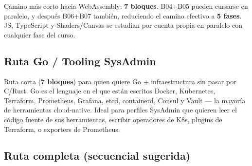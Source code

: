 \documentclass[11pt, letterpaper]{article}
\begin{document}
Camino más corto hacia WebAssembly: \textbf{7 bloques}. B04+B05 pueden
cursarse en paralelo, y después B06+B07 también, reduciendo el camino
efectivo a \textbf{5 fases}. JS, TypeScript y Shaders/Canvas se estudian
por cuenta propia en paralelo con cualquier fase del curso.

\subsection{Ruta Go / Tooling SysAdmin}

\begin{center}
\end{center}

Ruta corta (\textbf{7 bloques}) para quien quiere Go + infraestructura
sin pasar por C/Rust. Go es el lenguaje en el que están escritos Docker,
Kubernetes, Terraform, Prometheus, Grafana, etcd, containerd, Consul y
Vault --- la mayoría de herramientas cloud-native. Ideal para perfiles
SysAdmin que quieren leer el código fuente de sus herramientas, escribir
operadores de K8s, plugins de Terraform, o exporters de Prometheus.

\subsection{Ruta completa (secuencial sugerida)}
\end{document}
